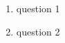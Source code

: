 \documentclass[10pt]{article}
\begin{document}
\begin{enumerate}
  
  \item question 1

  \item question 2

\end{enumerate}
\end{document}
